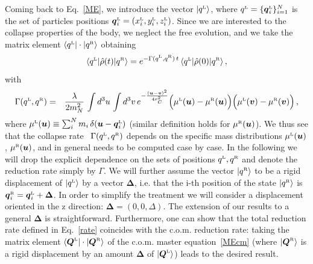 \documentclass[11pt,onecolumn,amssymb,nofootinbib]{revtex4}
\newcommand\beqa{\begin{eqnarray}}
\newcommand\eeqa{\end{eqnarray}}
\newcommand\bQ{\boldsymbol{Q}}
\newcommand\bu{\boldsymbol{u}}
\newcommand\bv{\boldsymbol{v}}
\begin{document}
 
Coming back to Eq.~\eqref{ME}, we introduce the vector $|q^{\text{\tiny{L}}}\rangle$, where $q^{\text{\tiny{L}}}=\{\boldsymbol{q}^{\text{\tiny{L}}}_i\}_{i=1}^N$ is the set of particles positions $\boldsymbol{q}^{\text{\tiny{L}}}_i=(x^{\text{\tiny{L}}}_i,y^{\text{\tiny{L}}}_i,z^{\text{\tiny{L}}}_i)$. Since we are interested to the collapse properties of the body, we neglect the free evolution, and we take the matrix element $\langle q^{\text{\tiny{L}}}|\cdot|q^{\text{\tiny{R}}}\rangle$ obtaining
\begin{equation}
\langle q^{\text{\tiny{L}}}|\hat{\rho}(t)|q^{\text{\tiny{R}}}\rangle=e^{-\Gamma(q^{\text{\tiny{L}}},q^{\text{\tiny{R}}})\,t}\,\langle q^{\text{\tiny{L}}}|\hat{\rho}(0)|q^{\text{\tiny{R}}}\rangle\,,
\end{equation}
with
\beqa\label{rate}
\Gamma(q^{\text{\tiny{L}}},q^{\text{\tiny{R}}})&=&\frac{\lambda}{2m_N^2}\,\int d^3u\,\int d^3v\,e^{-\frac{(\boldsymbol{u}-\boldsymbol{v})^2}{4r_C^2}} \Big(\mu^{\text{\tiny{L}}}(\bu)-\mu^{\text{\tiny{R}}}(\bu)\Big)\Big(\mu^{\text{\tiny{L}}}(\bv)-\mu^{\text{\tiny{R}}}(\bv)\Big)\,,
\eeqa
where $\mu^{\text{\tiny{L}}}(\bu)\equiv\sum_i^N m_i\,\delta(\boldsymbol{u}-\boldsymbol{q}_i^{\text{\tiny{L}}})$ (similar definition holds for $\mu^{\text{\tiny{R}}}(\bu)$).
We thus see that the collapse rate ~$\Gamma(q^{\text{\tiny{L}}},q^{\text{\tiny{R}}})$ depends on the specific mass distributions  $\mu^{\text{\tiny{L}}}(\bu)$, $\mu^{\text{\tiny{R}}}(\bu)$, and  in general needs to be computed case by case. In the following we will drop the explicit dependence on the sets of positions $q^{\text{\tiny{L}}},q^{\text{\tiny{R}}}$ and denote the reduction rate simply by $\Gamma$. We will further assume the vector $|q^{\text{\tiny{R}}}\rangle$ to be a rigid displacement of $|q^{\text{\tiny{L}}}\rangle$ by a vector $\boldsymbol{\Delta}$, i.e. that the i-th position of the state $|q^{\text{\tiny{R}}}\rangle$ is $\boldsymbol{q}^{\text{\tiny{R}}}_i=\boldsymbol{q}^{\text{\tiny{L}}}_i+\boldsymbol{\Delta}$. In order to simplify the treatment we will consider a displacement oriented in the z direction: $\boldsymbol{\Delta}=(0,0,\Delta)$. The extension of our results to a general $\boldsymbol{\Delta}$ is straightforward. Furthermore, one can show that the total reduction rate defined in Eq.~\eqref{rate} coincides with the c.o.m. reduction rate: taking the matrix element $\langle\bQ^{\text{\tiny{L}}}|\cdot|\bQ^{\text{\tiny{R}}}\rangle$ of the c.o.m. master equation~\eqref{MEcm} (where $|\bQ^{\text{\tiny{R}}}\rangle$ is a rigid displacement by an amount $\boldsymbol{\Delta}$ of $|\bQ^{\text{\tiny{L}}}\rangle$) leads to the desired result. %
\end{document}
